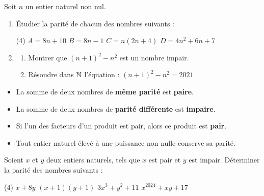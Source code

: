 \documentclass[10pt, a4paper]{article}
\begin{document}
\begin{Application}[][15 min]
Soit $n$ un entier naturel non nul.
\begin{enumerate}[leftmargin=*,itemsep=0.5pt]
    \item Étudier la parité de chacun des nombres suivants :
\begin{tasks}[label=$\bullet$, label-width=12pt, item-indent=15pt](4)
    \task $A=8n+10$
    \task $B=8n-1$
    \task $C=n(2n+4)$
    \task $D=4n^2+6n+7$
\end{tasks}
    \item
    \begin{enumerate}[leftmargin=*,itemsep=0.5pt]
        \item Montrer que $(n + 1)^2 - n^2$ est un nombre impair.
        \item Résoudre dans $\mathbb{N}$ l'équation : $(n + 1)^2 - n^2 = 2021$
    \end{enumerate}
\end{enumerate}
\end{Application}

\begin{Propriete}
\begin{itemize}[leftmargin=*,itemsep=0.5pt]
  \item La somme de deux nombres de \textbf{même parité} est \textbf{paire}.
  \item La somme de deux nombres de \textbf{parité différente} est \textbf{impaire}.
  \item Si l'un des facteurs d'un produit est pair, alors ce produit est \textbf{pair}.
  \item Tout entier naturel élevé à une puissance non nulle conserve sa parité.
\end{itemize}
\end{Propriete}

\begin{Application}[][15 min]
Soient $x$  et $y$ deux entiers naturels, tels que $x$ est pair et $y$ est impair. Déterminer la parité des nombres suivants :
\vspace{0.3cm}
\begin{center}
\begin{tasks}[label=$\bullet$, label-width=10pt, item-indent=25pt](4)
    \task $x + 8y$
    \task $(x + 1)(y + 1)$
    \task $3x^3 + y^2 + 11$
    \task $x^{2024} + xy + 17$
\end{tasks}
\end{center}
\end{Application}
\end{document}
